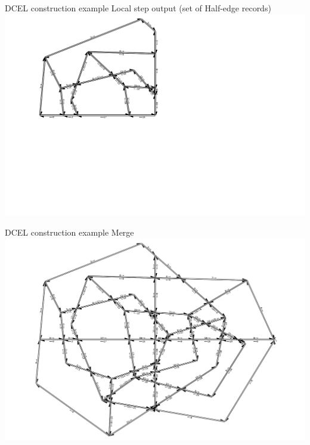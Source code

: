 \documentclass{beamer}
\begin{document}
\begin{frame}{DCEL construction example}
    \centering 
    Local step output (set of Half-edge records) \\
    \includegraphics[width=0.8\linewidth]{figures/DCEL05_localDCEL} 
\end{frame}

\begin{frame}{DCEL construction example}
    \centering 
    Merge \\
    \includegraphics[width=0.8\linewidth]{figures/DCEL06_Merge} 
\end{frame}
\end{document}
